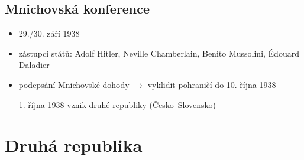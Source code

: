 \documentclass{article}
\begin{document}
\subsection*{Mnichovská konference}
\begin{itemize}
    \item 29./30. září 1938
    \item zástupci států: Adolf Hitler, Neville Chamberlain, Benito Mussolini, Édouard Daladier
    \item podepsání Mnichovské dohody $\rightarrow$ vyklidit pohraničí do 10. října 1938
    \item[1. října 1938] vznik druhé republiky (Česko--Slovensko)
\end{itemize}

\section*{Druhá republika}
\end{document}
